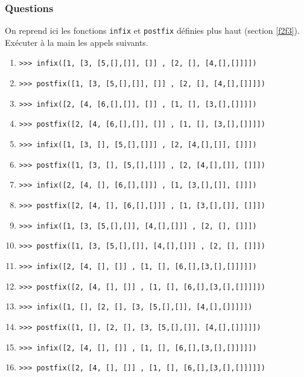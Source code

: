 \subsubsection{Questions}
On reprend ici les fonctions \texttt{infix} et \texttt{postfix} définies plus haut 
(section \ref{f2f3}). Exécuter à la main les appels suivants.

\begin{enumerate}
\item \texttt{>{>}> infix([1, [3, [5,[],[]], []] , [2, [], [4,[],[]]]])}
\item \texttt{>{>}> postfix([1, [3, [5,[],[]], []] , [2, [], [4,[],[]]]])}

\item \texttt{>{>}> infix([2, [4, [6,[],[]], []] , [1, [], [3,[],[]]]])}
\item \texttt{>{>}> postfix([2, [4, [6,[],[]], []] , [1, [], [3,[],[]]]])}

\item \texttt{>{>}> infix([1, [3, [], [5,[],[]]] , [2, [4,[],[]], []]])}
\item \texttt{>{>}> postfix([1, [3, [], [5,[],[]]] , [2, [4,[],[]], []]])}

\item \texttt{>{>}> infix([2, [4, [], [6,[],[]]] , [1, [3,[],[]], []]])}
\item \texttt{>{>}> postfix([2, [4, [], [6,[],[]]] , [1, [3,[],[]], []]])}

\item \texttt{>{>}> infix([1, [3, [5,[],[]], [4,[],[]]] , [2, [], []]])}
\item \texttt{>{>}> postfix([1, [3, [5,[],[]], [4,[],[]]] , [2, [], []]])}

\item \texttt{>{>}> infix([2, [4, [], []] , [1, [], [6,[],[3,[],[]]]]])}
\item \texttt{>{>}> postfix([2, [4, [], []] , [1, [], [6,[],[3,[],[]]]]])}

\item \texttt{>{>}> infix([1, [], [2, [], [3, [5,[],[]], [4,[],[]]]]])}
\item \texttt{>{>}> postfix([1, [], [2, [], [3, [5,[],[]], [4,[],[]]]]])}

\item \texttt{>{>}> infix([2, [4, [], []] , [1, [], [6,[],[3,[],[]]]]])}
\item \texttt{>{>}> postfix([2, [4, [], []] , [1, [], [6,[],[3,[],[]]]]])}


\end{enumerate}
